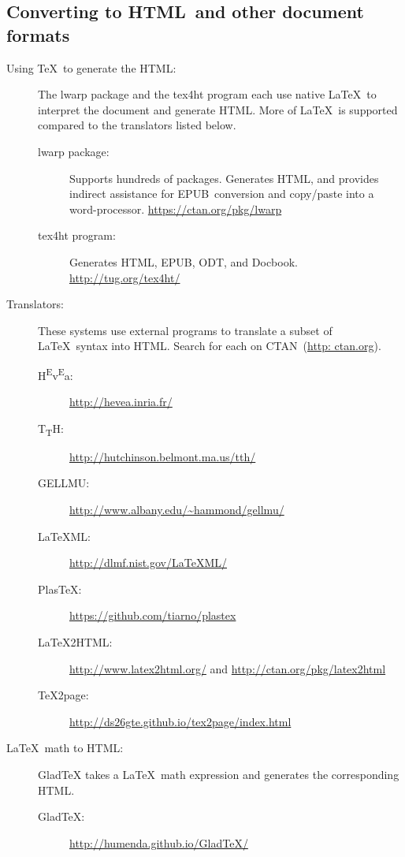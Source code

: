 \documentclass{article}
\def\CTAN{\acro{CTAN}}
\def\HTML{\acro{HTML}}
\def\EPUB{\acro{EPUB}}
\def\ODT{\acro{ODT}}
\newcommand{\acro}[1]{\textsc{\MakeLowercase{#1}}}
\def\\{ }%
\def\pkg#1{#1}%
\def\TeX{TeX}%
\def\LaTeX{LaTeX}%
\def\prog#1{\detokenize{#1}}%
\def\acro#1{#1}%
\def\HTML{HTML}%
\def\ODT{ODT}%
\def\EPUB{EPUB}%
\renewcommand*{\pkg}[1]{#1}
\renewcommand*{\prog}[1]{#1}
\renewcommand*{\TeX}{TeX}
\renewcommand*{\LaTeX}{LaTeX}
\begin{document}
\subsection{Converting to \HTML\ and other document formats}

\begin{description}
    \item[Using \TeX\ to generate the \HTML:]
        The \pkg{lwarp} package and the \prog{tex4ht} program
        each use native \LaTeX\ to interpret the document and generate \HTML.
        More of \LaTeX\ is supported compared to the translators listed below.
        \begin{description}
        \item [\pkg{lwarp} package:] Supports hundreds of packages.  Generates \HTML,
            and provides indirect assistance for \EPUB\ conversion and
            copy/paste into a word-processor.
            \url{https://ctan.org/pkg/lwarp}
        \item [\prog{tex4ht} program:] Generates \HTML, \EPUB, \ODT, and Docbook.
            \url{http://tug.org/tex4ht/}
        \end{description}

    \item[Translators:]
        These systems use external programs to translate a subset of \LaTeX\ syntax
        into \HTML.  Search for each on \CTAN\ (\url{http:\\ctan.org}).
        \begin{description}
        \item [H\textsuperscript{E}v\textsuperscript{E}a:] \url{http://hevea.inria.fr/}
        \item [T\textsubscript{T}H:] \url{http://hutchinson.belmont.ma.us/tth/}
        \item [GELLMU:] \url{http://www.albany.edu/~hammond/gellmu/}
        \item [\LaTeX{}ML:] \url{http://dlmf.nist.gov/LaTeXML/}
        \item [PlasTeX:] \url{https://github.com/tiarno/plastex}
        \item [\LaTeX2HTML:] \url{http://www.latex2html.org/}
                            and \url{http://ctan.org/pkg/latex2html}
        \item [\TeX2page:] \url{http://ds26gte.github.io/tex2page/index.html}
        \end{description}
    \item[\LaTeX\ math to \HTML:]
        \prog{Glad\TeX} takes a \LaTeX\ math expression and generates
        the corresponding \HTML.
        \begin{description}
        \item[\prog{Glad\TeX}:] \url{http://humenda.github.io/GladTeX/}
        \end{description}
\end{description}
\end{document}
